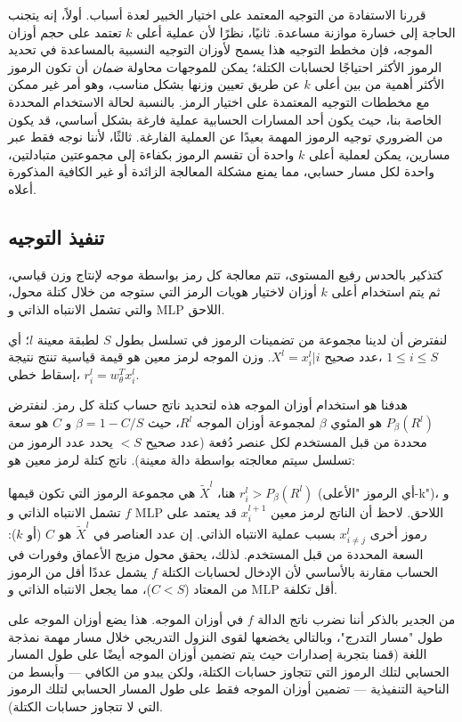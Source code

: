 \documentclass[11pt, a4paper, onecolumn, logo, copyright]{googledeepmind}
\begin{document}
قررنا الاستفادة من التوجيه المعتمد على اختيار الخبير لعدة أسباب. أولاً، إنه يتجنب الحاجة إلى خسارة موازنة مساعدة. ثانيًا، نظرًا لأن عملية أعلى $k$ تعتمد على حجم أوزان الموجه، فإن مخطط التوجيه هذا يسمح لأوزان التوجيه النسبية بالمساعدة في تحديد الرموز الأكثر احتياجًا لحسابات الكتلة؛ يمكن للموجهات محاولة \emph{ضمان} أن تكون الرموز الأكثر أهمية من بين أعلى $k$ عن طريق تعيين وزنها بشكل مناسب، وهو أمر غير ممكن مع مخططات التوجيه المعتمدة على اختيار الرمز. بالنسبة لحالة الاستخدام المحددة الخاصة بنا، حيث يكون أحد المسارات الحسابية عملية فارغة بشكل أساسي، قد يكون من الضروري توجيه الرموز المهمة بعيدًا عن العملية الفارغة. ثالثًا، لأننا نوجه فقط عبر مسارين، يمكن لعملية أعلى $k$ واحدة أن تقسم الرموز بكفاءة إلى مجموعتين متبادلتين، واحدة لكل مسار حسابي، مما يمنع مشكلة المعالجة الزائدة أو غير الكافية المذكورة أعلاه.

\subsection{تنفيذ التوجيه}
\label{sec:routing-implementation}
كتذكير بالحدس رفيع المستوى، تتم معالجة كل رمز بواسطة موجه لإنتاج وزن قياسي، ثم يتم استخدام أعلى $k$ أوزان لاختيار هويات الرمز التي ستوجه من خلال كتلة محول، والتي تشمل الانتباه الذاتي و MLP اللاحق.

لنفترض أن لدينا مجموعة من تضمينات الرموز في تسلسل بطول $S$ لطبقة معينة $l$؛ أي $X^l = {x_i^l | i \text{ عدد صحيح، }1 \leq i \leq S }$. وزن الموجه لرمز معين هو قيمة قياسية تنتج نتيجة إسقاط خطي، $r_i^l=w_\theta^Tx_i^l$.

هدفنا هو استخدام أوزان الموجه هذه لتحديد ناتج حساب كتلة كل رمز. لنفترض $P_\beta(R^l)$ هو المئوي $\beta$ لمجموعة أوزان الموجه $R^l$، حيث $\beta=1 - C/S$ و $C$ هو سعة محددة من قبل المستخدم لكل عنصر دُفعة (عدد صحيح $<S$ يحدد عدد الرموز من تسلسل سيتم معالجته بواسطة دالة معينة). ناتج كتلة لرمز معين هو:



هنا، $\tilde{X}^l$ هي مجموعة الرموز التي تكون قيمها $r_i^l > P_\beta(R^l)$ (أي الرموز "الأعلى-k")، و $f$ تشمل الانتباه الذاتي و MLP اللاحق. لاحظ أن الناتج لرمز معين $x_i^{l+1}$ قد يعتمد على رموز أخرى $x_{i \neq j}^l$ بسبب عملية الانتباه الذاتي. إن عدد العناصر في $\tilde{X}^l$ هو $C$ (أو $k$): السعة المحددة من قبل المستخدم. لذلك، يحقق محول مزيج الأعماق وفورات في الحساب مقارنة بالأساسي لأن الإدخال لحسابات الكتلة $f$ يشمل عددًا أقل من الرموز من المعتاد ($C < S$)، مما يجعل الانتباه الذاتي و MLP أقل تكلفة.

من الجدير بالذكر أننا نضرب ناتج الدالة $f$ في أوزان الموجه. هذا يضع أوزان الموجه على طول "مسار التدرج"، وبالتالي يخضعها لقوى النزول التدريجي خلال مسار مهمة نمذجة اللغة (قمنا بتجربة إصدارات حيث يتم تضمين أوزان الموجه أيضًا على طول المسار الحسابي لتلك الرموز التي تتجاوز حسابات الكتلة، ولكن يبدو من الكافي --- وأبسط من الناحية التنفيذية --- تضمين أوزان الموجه فقط على طول المسار الحسابي لتلك الرموز التي لا تتجاوز حسابات الكتلة).
\end{document}
